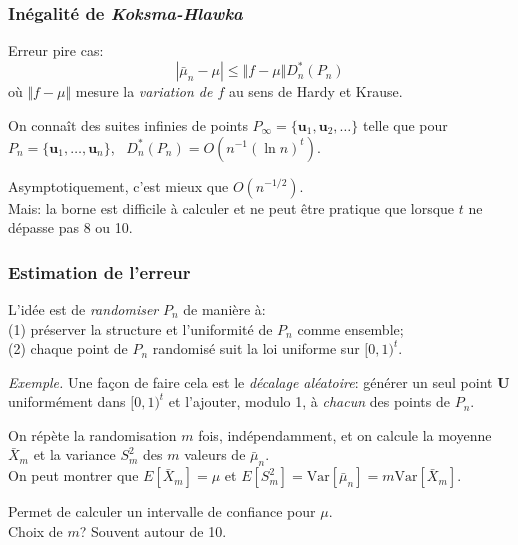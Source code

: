 \documentclass[t,usepdftitle=false]{beamer}
\def\bu{\boldsymbol{u}}
\def\bU{\boldsymbol{U}}
\def\Var{\mbox{Var}}
\begin{document}
\begin{frame}
	\frametitle{In\'egalit\'e de \emph{Koksma-Hlawka}}
	
	Erreur pire cas:
	\[
	|\bar\mu_n - \mu| \le \Vert f-\mu\Vert D_n^*(P_n)
	\]
	o\`u $\Vert f-\mu\Vert$ mesure la \emph{variation de $f$}
	au sens de Hardy et Krause.
	
	
	On connaît des suites infinies de points $P_\infty = \{\bu_1,\bu_2,\dots\}$
	telle que pour $P_n = \{\bu_1,\dots,\bu_n\}$, 
	\ $D_n^*(P_n) = O(n^{-1}(\ln n)^t)$.
	
	\mbox{}
	
	Asymptotiquement, c'est mieux que $O(n^{-1/2})$.\\
	
	Mais: la borne est difficile \`a calculer et ne peut \^etre pratique que
	lorsque $t$ ne d\'epasse pas 8 ou 10.
	
\end{frame}

\begin{frame}
	\frametitle{Estimation de l'erreur}
	
	L'id\'ee est de \emph{randomiser} $P_n$ de mani\`ere \`a:\\
	(1) pr\'eserver la structure et l'uniformit\'e de $P_n$ comme ensemble;\\
	(2) chaque point de $P_n$ randomis\'e suit la loi uniforme sur $[0,1)^t$.
	
\mbox{}
	
	\emph{Exemple.} Une fa\c{c}on de faire cela est le 
	\emph{d\'ecalage al\'eatoire}: g\'en\'erer un seul point 
	$\bU$ uniform\'ement dans $[0,1)^t$ et l'ajouter, modulo 1, \`a 
	\emph{chacun} des points de $P_n$.
	
\mbox{}
	
	On r\'ep\`ete la randomisation ${m}$ fois, ind\'ependamment, et on calcule
	la moyenne ${\bar X_m}$ et la variance ${S_{m}^2}$ des $m$ valeurs de 
	$\bar\mu_n$.\\
	On peut montrer que $E[\bar X_m] = \mu$ et 
	$E[S_{m}^2] = \Var[\bar\mu_n] = m\Var[\bar X_m]$.
	
\mbox{}
	
	Permet de calculer un intervalle de confiance pour $\mu$.\\
	Choix de $m$?  Souvent autour de 10.	
	
\end{frame}
\end{document}
